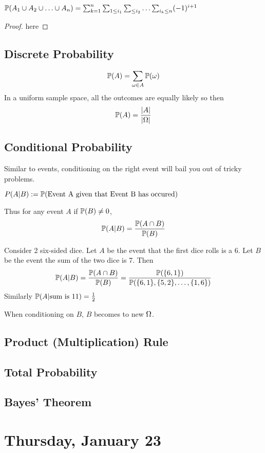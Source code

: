 \documentclass[11pt]{scrartcl}
\begin{document}
\begin{theorem}
	$\mathbb{P}(A_1\cup A_2\cup\ldots\cup A_{n} )= \sum_{k=1}^n \sum_{1\leq i_1} \sum_{\leq i_2}\ldots\sum_{i_{k} \leq
		n} (-1)^{i+1}$
\end{theorem}
\begin{proof}
	here
\end{proof}

\subsection{Discrete Probability} 
\[
\mathbb{P}(A) = \sum_{\omega \in  A} \mathbb{P}(\omega)
\] 
In a uniform sample space, all the outcomes are equally likely so then \[
  \mathbb{P}(A) = \frac{|A|}{|\Omega|}
\]
\subsection{Conditional Probability} 
Similar to events, conditioning on the right event will bail you out of tricky problems.
\begin{definition}
  $P(A|B) := \mathbb{P}(\text{Event A given that Event B has occured})$ 
\end{definition} 
Thus for any event $A$ if $\mathbb{P}(B)\neq 0$, \[
\mathbb{P}(A|B) = \frac{\mathbb{P}(A\cap B)}{\mathbb{P}(B)}\] 
\begin{example}
  Consider 2 six-sided dice. Let $A$ be the event that the first dice rolls is
  a 6. Let  $B$ be the event the sum of the two dice is 7. Then \[
    \mathbb{P}(A|B) = \frac{\mathbb{P}(A\cap B)}{\mathbb{P}(B)} = \frac{\mathbb{P}(\{6,1\})}{\mathbb{P}(\{6,1\},
    \{5,2\},\ldots,\{1,6\})}
  \]
  Similarly $\mathbb{P}(A|\text{sum is 11})=\frac{1}{2}$
\end{example}
When conditioning on $B$,  $B$ becomes to new  $\Omega$. 

\subsection{Product (Multiplication) Rule} 
\subsection{Total Probability}
\subsection{Bayes' Theorem} 
\newpage
\section{Thursday, January 23}
\end{document}
